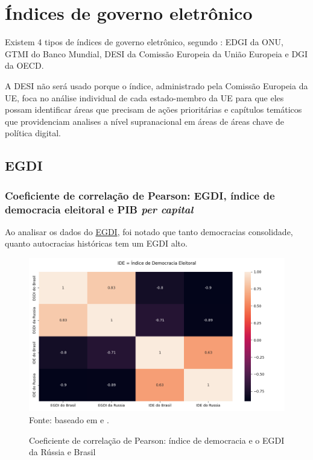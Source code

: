 \section{Índices de governo eletrônico}

Existem 4 tipos de índices de governo eletrônico, segundo \cite{martinez2022egovernment}: EDGI da ONU, GTMI do Banco Mundial, DESI da Comissão Europeia da União Europeia e DGI da OECD.

A DESI não será usado porque o índice, administrado pela Comissão Europeia da UE, foca no análise individual de cada estado-membro da UE para que eles possam identificar áreas que precisam de ações prioritárias e capítulos temáticos que providenciam analises a nível supranacional em áreas de áreas chave de política digital.

\subsection{EGDI}


\subsubsection{Coeficiente de correlação de Pearson: EGDI, índice de democracia eleitoral e PIB \textit{per capital}}

Ao analisar os dados do \href{https://publicadministration.un.org/egovkb/en-us/About/Overview/-E-Government-Development-Index}{EGDI}, foi notado que tanto democracias consolidade, quanto autocracias históricas tem um EGDI alto. 

\begin{figure}[H]
    \centering
    \caption{Coeficiente de correlação de Pearson: índice de democracia e o EGDI da Rússia e Brasil}
    \includegraphics[width=1\linewidth]{figuras/egdi/correlacao3.png}
    \label{fig:correlacao3}
    \footnotesize{Fonte: baseado em \cite{ONU_edgi_mapa} e \cite{electoral_democracy_index}.}
\end{figure}

